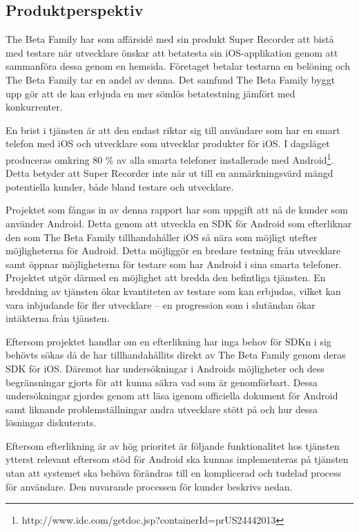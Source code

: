 \subsection{Produktperspektiv}
\label{subsec:perspective}

The Beta Family har som affärsidé med sin produkt Super Recorder att bistå med testare när utvecklare önskar att betatesta sin iOS-applikation genom att sammanföra dessa genom en hemsida. Företaget betalar testarna en belöning och The Beta Family tar en andel av denna. Det samfund The Beta Family byggt upp gör att de kan erbjuda en mer sömlös betatestning jämfört med konkurrenter. 

En brist i tjänsten är att den endast riktar sig till användare som har en smart telefon med iOS och utvecklare som utvecklar produkter för iOS. I dagsläget produceras omkring 80 \% av alla smarta telefoner installerade med Android\footnote{ http://www.idc.com/getdoc.jsp?containerId=prUS24442013}. Detta betyder att Super Recorder inte når ut till en anmärkningsvärd mängd potentiella kunder, både bland testare och utvecklare.

Projektet som fångas in av denna rapport har som uppgift att nå de kunder som använder Android. Detta genom att utveckla en SDK för Android som efterliknar den som The Beta Family tillhandahåller iOS så nära som möjligt utefter möjligheterna för Android. Detta möjliggör en bredare testning från utvecklare samt öppnar möjligheterna för testare som har Android i sina smarta telefoner. Projektet utgör därmed en möjlighet att bredda den befintliga tjänsten. En breddning av tjänsten ökar kvantiteten av testare som kan erbjudas, vilket kan vara inbjudande för fler utvecklare – en progression som i slutändan ökar intäkterna från tjänsten.

Eftersom projektet handlar om en efterlikning har inga behov för SDKn i sig behövts sökas då de har tillhandahållits direkt av The Beta Family genom deras SDK för iOS. Däremot har undersökningar i Androids möjligheter och dess begränsningar gjorts för att kunna säkra vad som är genomförbart. Dessa undersökningar gjordes genom att läsa igenom officiella dokument för Android samt liknande problemställningar andra utvecklare stött på och hur dessa lösningar diskuterats.

Eftersom efterlikning är av hög prioritet är följande funktionalitet hos tjänsten ytterst relevant eftersom stöd för Android ska kunnas implementeras på tjänsten utan att systemet ska behöva förändras till en komplicerad och tudelad process för användare. Den nuvarande processen för kunder beskrivs nedan.

